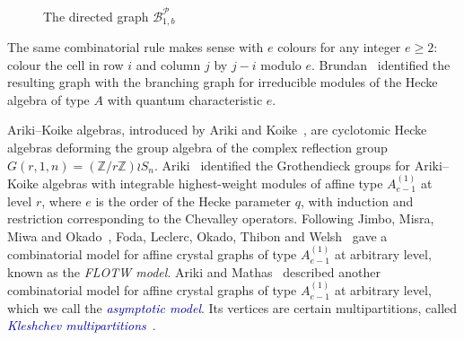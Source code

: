 \documentclass[11pt]{article}
\theoremstyle{definition}
\theoremstyle{remark}
\theoremstyle{definition}
\numberwithin{equation}{section}
\renewcommand\emph[1]{\textcolor{darkblue}{\it #1}}
\begin{document}
\begin{figure}[h]
{}
\caption{The directed graph \( \mathcal{B}_{1,b}^{\mathcal{P}} \)}
\label{fig:checkerboard}
\end{figure}

The same combinatorial rule makes sense with \(e\) colours for any integer \(e\geq2\): colour the cell in row \(i\) and column \(j\) by \(j-i\) modulo \(e\). Brundan~\cite[Theorem~2.6, p.~554]{Br98} identified the resulting graph with the branching graph for irreducible modules of the Hecke algebra of type \(A\) with quantum characteristic \(e\).

Ariki--Koike algebras, introduced by Ariki and Koike~\cite[Definition~3.1, p.~217]{AK94}, are cyclotomic Hecke algebras deforming the group algebra of the complex reflection group $G(r,1,n)=(\mathbb{Z}/r\mathbb{Z})\wr S_n$. Ariki~\cite[Theorem~4.4, p.~806]{Ari96} identified the Grothendieck groups for Ariki--Koike algebras with integrable highest-weight modules of affine type $A_{e-1}^{(1)}$ at level $r$, where $e$ is the order of the Hecke parameter $q$, with induction and restriction corresponding to the Chevalley operators. Following Jimbo, Misra, Miwa and Okado~\cite[Theorems~3.8 and~3.13, pp.~554 and~556]{JMMO91}, Foda, Leclerc, Okado, Thibon and Welsh~\cite[Theorem~2.10 and Proposition~2.11]{FLOTW99} gave a combinatorial model for affine crystal graphs of type $A_{e-1}^{(1)}$ at arbitrary level, known as the \textit{FLOTW model}. Ariki and Mathas~\cite[Theorem~2.8 and Corollary~2.10, pp.~620--621]{AM00} described another combinatorial model for affine crystal graphs of type $A_{e-1}^{(1)}$ at arbitrary level, which we call the \emph{asymptotic model}. Its vertices are certain multipartitions, called \emph{Kleshchev multipartitions}~\cite[p.~605]{AM00}.
\end{document}

